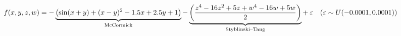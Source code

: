 \documentclass[]{article}
\let\originalleft\left
\let\originalright\right
\renewcommand{\left}{\mathopen{}\mathclose\bgroup\originalleft}
\renewcommand{\right}{\aftergroup\egroup\originalright}
\begin{document}
\[
f(x,y,z,w) = -\underbrace{\left(\sin(x+y) + (x-y)^2 - 1.5x+2.5y+1\right)}_{\text{McCormick}}-\underbrace{\left(\frac{z^4 - 16z^2 + 5z + w^4 - 16w + 5w}{2}\right)}_\text{Styblinski–Tang}+\:\varepsilon \quad (\varepsilon \sim U(-0.0001,0.0001))
\]
\end{document}
